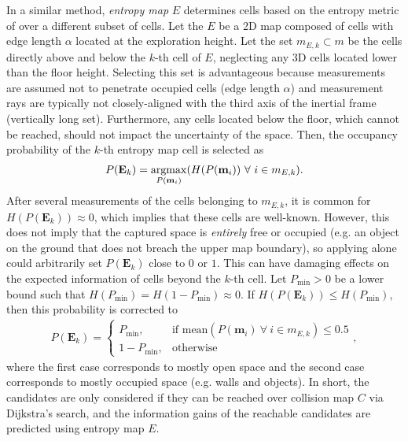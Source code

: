 In a similar method, \emph{entropy map} $E$ determines cells based on the entropy metric of  over a different subset of cells. Let the $E$ be a 2D map composed of cells with edge length $\alpha$ located at the exploration height. Let the set $m_{E,k}\subset m$ be the cells directly above and below the $k$-th cell of $E$, neglecting any 3D cells located lower than the floor height. Selecting this set is advantageous because measurements are assumed not to penetrate occupied cells (edge length $\alpha$) and measurement rays are typically not closely-aligned with the third axis of the inertial frame (vertically long set). Furthermore, any cells located below the floor, which cannot be reached, should not impact the uncertainty of the space. Then, the occupancy probability of the $k$-th entropy map cell is selected as
\begin{align}
\label{eqn:ProbEntropyMap}
P(\mathbf{E}_k)=\argmax_{P(\mathbf{m}_i)}(H(P(\mathbf{m}_i))\ \forall \ i\in m_{E,k}).
\end{align}
After several measurements of the cells belonging to $m_{E,k}$, it is common for $H(P(\mathbf{E}_k))\approx0$, which implies that these cells are well-known. However, this does not imply that the captured space is \emph{entirely} free or occupied (e.g. an object on the ground that does not breach the upper map boundary), so applying  alone could arbitrarily set $P(\mathbf{E}_k)$ close to $0$ or $1$. This can have damaging effects on the expected information of cells beyond the $k$-th cell. Let $P_\text{min}>0$ be a lower bound such that $H(P_\text{min})=H(1-P_\text{min})\approx0$. If $H(P(\mathbf{E}_k))\leq H(P_\text{min})$, then this probability is corrected to
\begin{align}
P(\mathbf{E}_k)= 
\begin{cases}
    P_\text{min},			& \text{if } \text{mean}(P(\mathbf{m}_i)\ \forall \ i\in m_{E,k})\leq0.5\\
    1-P_\text{min},              & \text{otherwise}
\end{cases},
\end{align}
where the first case corresponds to mostly open space and the second case corresponds to mostly occupied space (e.g. walls and objects). In short, the candidates are only considered if they can be reached over collision map $C$ via Dijkstra's search, and the information gains of the reachable candidates are predicted using entropy map $E$.

